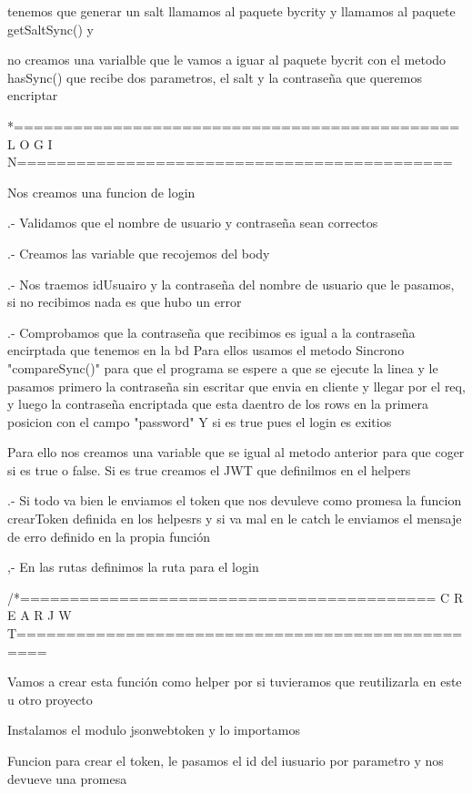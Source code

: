 tenemos que generar un salt llamamos al paquete bycrity y llamamos al paquete getSaltSync() y

 no creamos una varialble que le vamos a iguar al paquete bycrit con el metodo hasSync() que recibe dos parametros, el salt
 y la contraseña que queremos encriptar


 *=============================================L  O  G  I  N============================================


 Nos creamos una funcion de login
   
   .- Validamos que el nombre de usuario y contraseña sean correctos

   .- Creamos las variable que recojemos del body
 
   .- Nos traemos idUsuairo y la contraseña del nombre de usuario que le pasamos, si no recibimos nada es que hubo un error

   .- Comprobamos que la contraseña que recibimos es igual a la contraseña encirptada que tenemos en la bd
      Para ellos usamos el metodo Sincrono "compareSync()" para que el programa se espere a que se ejecute la linea
       y le pasamos primero la contraseña sin escritar que envia en cliente y llegar por el req,  y luego la 
       contraseña encriptada que esta daentro de los rows en la primera posicion con el campo "password" 
       Y si es true pues el login es exitios

       Para ello nos creamos una variable que se igual al metodo anterior para que coger si es true o false. Si es true
       creamos el JWT que definilmos en el helpers

    .- Si todo va bien le enviamos el  token que nos devuleve como promesa la funcion crearToken definida en los helpesrs
       y si va mal en le catch  le enviamos el mensaje de erro definido en la propia función

     
     ,-  En las rutas definimos la ruta para el login  





     /*========================================== C R E A R  J  W  T=================================================

      Vamos a crear esta función como helper por si tuvieramos que reutilizarla en este u otro proyecto

      Instalamos el modulo jsonwebtoken y lo importamos


     Funcion para crear el token, le pasamos el id del iusuario por parametro y nos devueve una promesa
    
